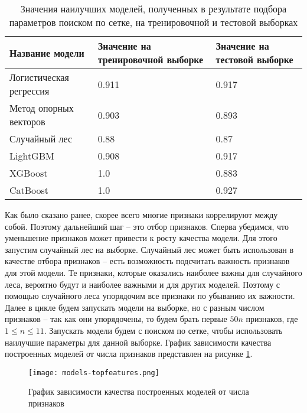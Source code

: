 \begin{table}[!htbp]
	\centering
	\small
	\caption{Значения наилучших моделей, полученных в результате подбора параметров поиском по сетке, на тренировочной и тестовой выборках}
	\begin{tabularx}{\linewidth}{|X|X|X|}
		\hline
		Название модели & Значение на тренировочной выборке & Значение на тестовой выборке\\ \hline
		Логистическая регрессия & 0.911 & 0.917 \\
		\hline 
		Метод опорных векторов & 0.903 & 0.893 \\
		\hline
		Случайный лес & 0.88 & 0.87 \\
		\hline
		LightGBM & 0.908 & 0.917 \\
		\hline
		XGBoost & 1.0 & 0.883 \\ %
		\hline
		CatBoost & 1.0 & 0.927 \\ 
		\hline
	\end{tabularx}	
	\label{tabl:gridsearch}
\end{table}

Как было сказано ранее, скорее всего многие признаки коррелируют между собой. Поэтому дальнейший шаг -- это отбор признаков. Сперва убедимся, что уменьшение признаков может привести к росту качества модели. Для этого запустим случайный лес на выборке. Случайный лес может быть использован в качестве отбора признаков -- есть возможность подсчитать важность признаков для этой модели. Те признаки, которые оказались наиболее важны для случайного леса, вероятно будут и наиболее важными и для других моделей. Поэтому с помощью случайного леса упорядочим все признаки по убыванию их важности. Далее в цикле будем запускать модели на выборке, но с разным числом признаков -- так как они упорядочены, то будем брать первые $50n$ признаков, где $1 \leq n \leq 11$. Запускать модели будем с поиском по сетке, чтобы использовать наилучшие параметры для данной выборке. График зависимости качества построенных моделей от числа признаков представлен на рисунке \ref{accuracy-numFeatures}.

\begin{figure}[!htbp]
	\begin{center}
		\texttt{[image: models-topfeatures.png]}\\
		\caption{График зависимости качества построенных моделей от числа признаков}
		\label{accuracy-numFeatures}
	\end{center}
\end{figure}

